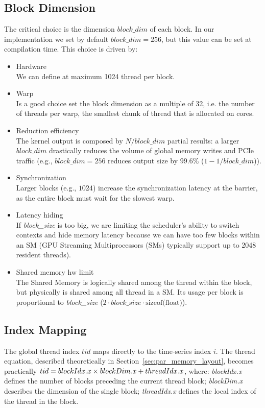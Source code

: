 \subsection{Block Dimension}
The critical choice is the dimension $block\_dim$ of each block. In our implementation we set by default $block\_dim = 256$, but this value can be set at compilation time. This choice is driven by:
\begin{itemize}
    \item Hardware \\
        We can define at maximum 1024 thread per block.
    \item Warp \\
        Is a good choice set the block dimension as a multiple of 32, i.e. the number of threads per warp, the smallest chunk of thread that is allocated on cores.
    \item Reduction efficiency \\
        The kernel output is composed by $N/block\_dim$ partial results: a larger $block\_dim$ drastically reduces the volume of global memory writes and PCIe traffic (e.g., $block\_dim=256$ reduces output size by $99.6\%$ ($1-1/block\_dim$)).
    \item Synchronization \\
        Larger blocks (e.g., $1024$) increase the synchronization latency at the barrier, as the entire block must wait for the slowest warp.
    \item Latency hiding \\
        If \textit{block\_size} is too big, we are limiting the scheduler's ability to switch contexts and hide memory latency because we can have too few blocks within an SM (GPU Streaming Multiprocessors (SMs) typically support up to 2048 resident threads).
    \item Shared memory hw limit \\
        The Shared Memory is logically shared among the thread within the block, but physically is shared among all thread in a SM. Its usage per block is proportional to \textit{block\_size} ($2 \cdot block\_size \cdot \text{sizeof(float)}$).
\end{itemize}

\subsection{Index Mapping}
The global thread index $tid$ maps directly to the time-series index $i$. The thread equation, described theoretically in Section~\ref{sec:par_memory_layout}, becomes practically $tid = blockIdx.x \\ \times blockDim.x + threadIdx.x$, where: \textit{blockIdx.x} defines the number of blocks preceding the current thread block; \textit{blockDim.x} describes the dimension of the single block; \textit{threadIdx.x} defines the local index of the thread in the block.